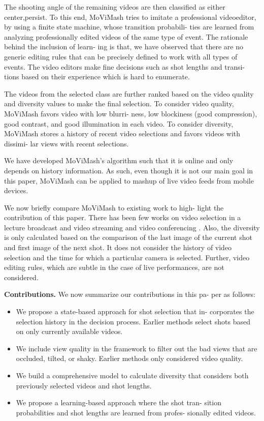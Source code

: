 \documentclass[conference]{IEEEtran}
\begin{document}
The shooting angle of the remaining videos are then classified as
either center,persist. To this end, MoViMash tries to imitate a professional videoeditor, by using a finite state machine, whose transition probabili-
ties are learned from analyzing professionally edited videos of the
same type of event. The rationale behind the inclusion of learn-
ing is that, we have observed that there are no generic editing rules
that can be precisely defined to work with all types of events. The
video editors make fine decisions such as shot lengths and transi-
tions based on their experience which is hard to enumerate.


The videos from the selected class are further ranked based on
the video quality and diversity values to make the final selection.
To consider video quality, MoViMash favors video with low blurri-
ness, low blockiness (good compression), good contrast, and good
illumination in each video. To consider diversity, MoViMash stores
a history of recent video selections and favors videos with dissimi-
lar views with recent selections.

We have developed MoViMash’s algorithm such that it is online
and only depends on history information. As such, even though
it is not our main goal in this paper, MoViMash can be applied to
mashup of live video feeds from mobile devices.

We now briefly compare MoViMash to existing work to high-
light the contribution of this paper. There has been few works on
video selection in a lecture broadcast and video streaming \cite{21} \cite{6}
and video conferencing \cite{3}. Also, the diversity is
only calculated based on the comparison of the last image of the
current shot and first image of the next shot. It does not consider
the history of video selection and the time for which a particular
camera is selected. Further, video editing rules, which are subtle in
the case of live performances, are not considered.

\textbf{Contributions. }We now summarize our contributions in this pa-
per as follows:
\begin{itemize}
    \item We propose a state-based approach for shot selection that in-
corporates the selection history in the decision process. Earlier methods select shots based on only currently available
videos.
    \item We include view quality in the framework to filter out the
bad views that are occluded, tilted, or shaky. Earlier methods
only considered video quality.
    \item We build a comprehensive model to calculate diversity that
considers both previously selected videos and shot lengths.
    \item We propose a learning-based approach where the shot tran-
sition probabilities and shot lengths are learned from profes-
sionally edited videos.
\end{itemize}
\end{document}
